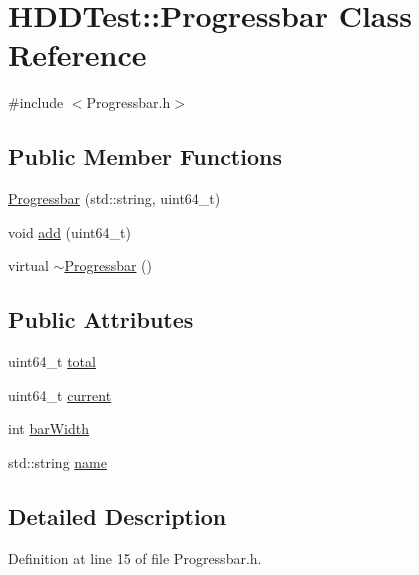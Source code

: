 \hypertarget{class_h_d_d_test_1_1_progressbar}{\section{H\-D\-D\-Test\-:\-:Progressbar Class Reference}
\label{class_h_d_d_test_1_1_progressbar}
}


{\ttfamily \#include $<$Progressbar.\-h$>$}

\subsection*{Public Member Functions}
\begin{DoxyCompactItemize}
\item 
\hyperlink{class_h_d_d_test_1_1_progressbar_ae8156d41aec4243b1328b62361965af1}{Progressbar} (std\-::string, uint64\-\_\-t)
\item 
void \hyperlink{class_h_d_d_test_1_1_progressbar_a031bb6b1e7a3305d441bc10353c37966}{add} (uint64\-\_\-t)
\item 
virtual \hyperlink{class_h_d_d_test_1_1_progressbar_a0abee569b47da1c25a8aef42339dc5f2}{$\sim$\-Progressbar} ()
\end{DoxyCompactItemize}
\subsection*{Public Attributes}
\begin{DoxyCompactItemize}
\item 
uint64\-\_\-t \hyperlink{class_h_d_d_test_1_1_progressbar_a611fb784d62df0f9f2d56ad90e15c47c}{total}
\item 
uint64\-\_\-t \hyperlink{class_h_d_d_test_1_1_progressbar_a8064f75e6a8ad05753bbff8752d6a5a7}{current}
\item 
int \hyperlink{class_h_d_d_test_1_1_progressbar_a754f1137a1b68fced60aebfc87269a84}{bar\-Width}
\item 
std\-::string \hyperlink{class_h_d_d_test_1_1_progressbar_a07e67985ad3a30bee17d36014a56b328}{name}
\end{DoxyCompactItemize}


\subsection{Detailed Description}


Definition at line 15 of file Progressbar.\-h.



